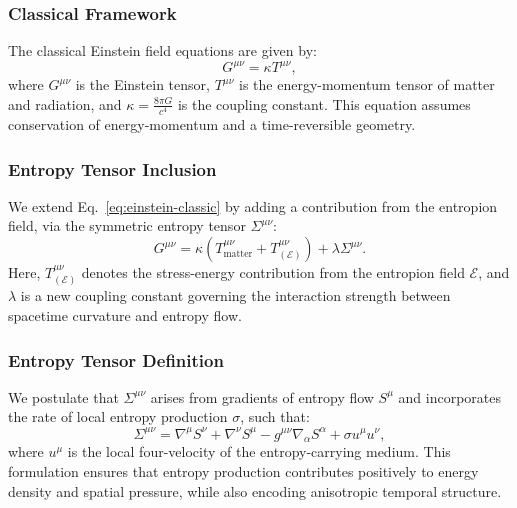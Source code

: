 \documentclass[12pt]{article}
\begin{document}
\subsubsection*{Classical Framework}

The classical Einstein field equations are given by:
\begin{equation} \label{eq:einstein-classic}
G^{\mu\nu} = \kappa T^{\mu\nu},
\end{equation}
where \( G^{\mu\nu} \) is the Einstein tensor, \( T^{\mu\nu} \) is the energy-momentum tensor of matter and radiation, and \( \kappa = \frac{8\pi G}{c^4} \) is the coupling constant. This equation assumes conservation of energy-momentum and a time-reversible geometry.

\subsubsection*{Entropy Tensor Inclusion}

We extend Eq.~\eqref{eq:einstein-classic} by adding a contribution from the entropion field, via the symmetric entropy tensor \( \Sigma^{\mu\nu} \):
\begin{equation} \label{eq:modified-einstein}
G^{\mu\nu} = \kappa \left( T^{\mu\nu}_{\text{matter}} + T^{\mu\nu}_{(\mathcal{E})} \right) + \lambda \Sigma^{\mu\nu}.
\end{equation}
Here, \( T^{\mu\nu}_{(\mathcal{E})} \) denotes the stress-energy contribution from the entropion field \( \mathcal{E} \), and \( \lambda \) is a new coupling constant governing the interaction strength between spacetime curvature and entropy flow.

\subsubsection*{Entropy Tensor Definition}

We postulate that \( \Sigma^{\mu\nu} \) arises from gradients of entropy flow \( S^\mu \) and incorporates the rate of local entropy production \( \sigma \), such that:
\begin{equation} \label{eq:entropy-tensor}
\Sigma^{\mu\nu} = \nabla^\mu S^\nu + \nabla^\nu S^\mu - g^{\mu\nu} \nabla_\alpha S^\alpha + \sigma u^\mu u^\nu,
\end{equation}
where \( u^\mu \) is the local four-velocity of the entropy-carrying medium. This formulation ensures that entropy production contributes positively to energy density and spatial pressure, while also encoding anisotropic temporal structure.
\end{document}
